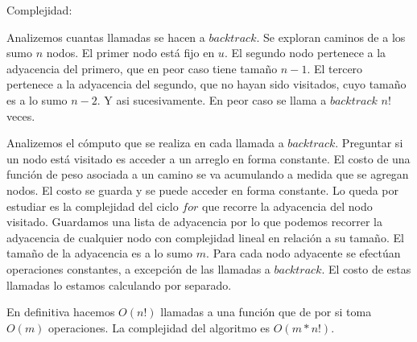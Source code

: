 Complejidad:

Analizemos cuantas llamadas se hacen a $backtrack$. Se exploran caminos de a los sumo $n$ nodos. El primer nodo está fijo en $u$. El segundo nodo
pertenece a la adyacencia del primero, que en peor caso tiene tamaño $n - 1$. El tercero pertenece a la adyacencia del segundo, que no hayan sido
visitados, cuyo tamaño es a lo sumo $n - 2$. Y asi sucesivamente. En peor caso se llama a $backtrack$ $n!$ veces.

Analizemos el cómputo que se realiza en cada llamada a $backtrack$. Preguntar si un nodo está visitado es acceder a un arreglo en forma constante.
El costo de una función de peso asociada a un camino se va acumulando a medida que se agregan nodos. El costo se guarda y se puede acceder en
forma constante. Lo queda por estudiar es la complejidad del ciclo $for$ que recorre la adyacencia del nodo visitado. Guardamos una lista de
adyacencia por lo que podemos recorrer la adyacencia de cualquier nodo con complejidad lineal en relación a su tamaño. El tamaño de la adyacencia
es a lo sumo $m$. Para cada nodo adyacente se efectúan operaciones constantes, a excepción de las llamadas a $backtrack$. El costo de estas
llamadas lo estamos calculando por separado.

En definitiva hacemos $O(n!)$ llamadas a una función que de por si toma $O(m)$ operaciones. La complejidad del algoritmo es $O(m*n!)$.

